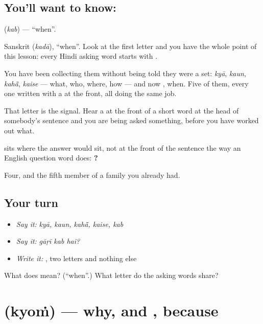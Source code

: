 \subsection*{You'll want to know: }
\textbf{} (\emph{kab}) — \textquotedblleft{}when\textquotedblright{}.

Sanskrit  (\emph{kadā}), \textquotedblleft{}when\textquotedblright{}. Look at the first letter and you have the whole point of this lesson: every Hindi asking word starts with \textbf{}.

You have been collecting them without being told they were a set: \emph{kyā}, \emph{kaun}, \emph{kahā̃}, \emph{kaise} — what, who, where, how — and now \textbf{}, when. Five of them, every one written with a  at the front, all doing the same job.

That letter is the signal. Hear a \textbf{} at the front of a short word at the head of somebody's sentence and you are being asked something, before you have worked out what.

 sits where the answer would sit, not at the front of the sentence the way an English question word does: \textbf{  ?}

\begin{grammarlens}[title={What you've built}]
Four, and the fifth member of a family you already had.
\end{grammarlens}

\subsection*{Your turn}
\begin{itemize}
\raggedright
  \item \emph{Say it:} \emph{kyā, kaun, kahā̃, kaise, kab}
  \item \emph{Say it:} \emph{gāṛī kab hai?}
  \item \emph{Write it:} , two letters and nothing else
\end{itemize}

\begin{tcolorbox}[breakable,colback=teal!4,colframe=teal!35!black,title={Before you move on}]
What does  mean? (\textquotedblleft{}when\textquotedblright{}.) What letter do the asking words share?
\end{tcolorbox}
\section[kyoṁ]{ (kyoṁ) — why, and , because}

